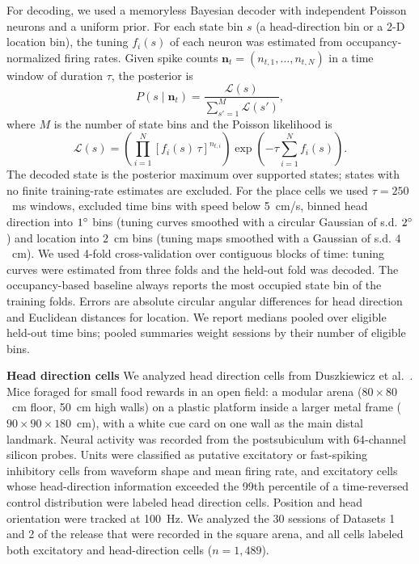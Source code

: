 \documentclass[11pt]{article}
\begin{document}
For decoding, we used a memoryless Bayesian decoder with independent Poisson neurons and a uniform prior. For each state bin $s$ (a head-direction bin or a 2-D location bin), the tuning $f_i(s)$ of each neuron was estimated from occupancy-normalized firing rates. Given spike counts $\mathbf{n}_t = (n_{t,1}, \dots, n_{t, N})$ in a time window of duration $\tau$, the posterior is
\begin{equation}
P(s \mid \mathbf{n}_t) = \frac{\mathcal{L}(s)}{\sum_{s'=1}^{M} \mathcal{L}(s')},
\label{eq:posterior}
\end{equation}
where $M$ is the number of state bins and the Poisson likelihood is
\begin{equation}
\mathcal{L}(s) = \left(\prod_{i=1}^{N} \left[f_i(s)\,\tau\right]^{n_{t,i}}\right) \exp\!\left(-\tau \sum_{i=1}^{N} f_i(s)\right).
\label{eq:likelihood}
\end{equation}
The decoded state is the posterior maximum over supported states; states with no finite training-rate estimates are excluded. For the place cells we used $\tau=250$~ms windows, excluded time bins with speed below 5~cm/s, binned head direction into $1\degree$ bins (tuning curves smoothed with a circular Gaussian of s.d. $2\degree$) and location into $2$~cm bins (tuning maps smoothed with a Gaussian of s.d. $4$~cm). We used 4-fold cross-validation over contiguous blocks of time: tuning curves were estimated from three folds and the held-out fold was decoded. The occupancy-based baseline always reports the most occupied state bin of the training folds. Errors are absolute circular angular differences for head direction and Euclidean distances for location. We report medians pooled over eligible held-out time bins; pooled summaries weight sessions by their number of eligible bins.

{\bf Head direction cells}
We analyzed head direction cells from Duszkiewicz et al.~\cite{Duszkiewicz2024}. Mice foraged for small food rewards in an open field: a modular arena ($80 \times 80$~cm floor, 50~cm high walls) on a plastic platform inside a larger metal frame ($90 \times 90 \times 180$~cm), with a white cue card on one wall as the main distal landmark. Neural activity was recorded from the postsubiculum with 64-channel silicon probes. Units were classified as putative excitatory or fast-spiking inhibitory cells from waveform shape and mean firing rate, and excitatory cells whose head-direction information exceeded the 99th percentile of a time-reversed control distribution were labeled head direction cells. Position and head orientation were tracked at 100~Hz. We analyzed the 30 sessions of Datasets 1 and 2 of the release that were recorded in the square arena, and all cells labeled both excitatory and head-direction cells ($n=1{,}489$).
\end{document}
